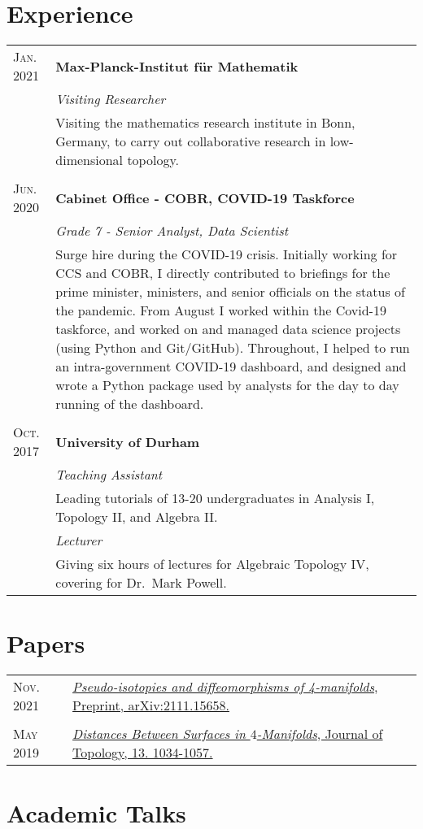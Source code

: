 \documentclass[a4paper]{article}
\makeatletter
\newcommand{\tablebreak}{\multicolumn{2}{c}{} \\}
\newlength{\datelength}
\newenvironment{datejobtable}{\begin{tabular}{@{} >{\raggedleft}p{\datelength} | p{\linewidth- \datelength - 2\tabcolsep - \arrayrulewidth} @{}}}{\end{tabular}}
\newcommand{\job}[5][]{

\textsc{#2} \ifthenelse{\equal{#3}{}}{}{to}  & \textbf{#4}\\
\ifthenelse{\equal{#3}{Present}}{Present}{\textsc{#3}}\ifthenelse{\equal{#1}{}}{}{&\textit{#1}\\}&\small #5\\
}
\newcommand{\subjob}[2][]{
\ifthenelse{\equal{#1}{}}{}{&\textit{#1}\\}&\small #2\\
}
\newcommand{\paper}[4][]{
\textsc{#2} & \href{#1}{\textit{#3},  #4.}\\
}
\newcommand{\arxivpaper}[4][]{
\paper[https://arxiv.org/abs/#4]{#2}{#3}{Preprint, arXiv:#4\ifthenelse{\equal{#1}{}}{}{, #1}}
}
\makeatother
\begin{document}
\section*{Experience}
\begin{datejobtable}

\job[Visiting Researcher]{Jan. 2021}{Mar. 2021}{Max-Planck-Institut f\"ur Mathematik}{Visiting the mathematics research institute in Bonn, Germany, to carry out collaborative research in low-dimensional topology.}

\tablebreak

\job[Grade 7 - Senior Analyst, Data Scientist]{Jun. 2020}{Dec. 2020}{Cabinet Office - COBR, COVID-19 Taskforce}{Surge hire during the COVID-19 crisis. Initially working for CCS and COBR, I directly contributed to briefings for the prime minister, ministers, and senior officials on the status of the pandemic. From August I worked within the Covid-19 taskforce, and worked on and managed data science projects (using Python and Git/GitHub). Throughout, I helped to run an intra-government COVID-19 dashboard, and designed and wrote a Python package used by analysts for the day to day running of the dashboard.}
\tablebreak
\job[Teaching Assistant]{Oct. 2017}{Present}{University of Durham}{Leading tutorials of 13-20 undergraduates in Analysis I, Topology II, and Algebra II.}
\subjob[Lecturer]{Giving six hours of lectures for Algebraic Topology IV, covering for Dr.~Mark Powell.}


\end{datejobtable}

\section*{Papers}

\begin{datejobtable}

\arxivpaper{Nov. 2021}{Pseudo-isotopies and diffeomorphisms of 4-manifolds}{2111.15658}
\tablebreak
\paper[https://arxiv.org/abs/1905.00763]{May 2019}{Distances Between Surfaces in $4$-Manifolds}{Journal of Topology, 13. 1034-1057}

\end{datejobtable} 

\section*{Academic Talks}
\end{document}
